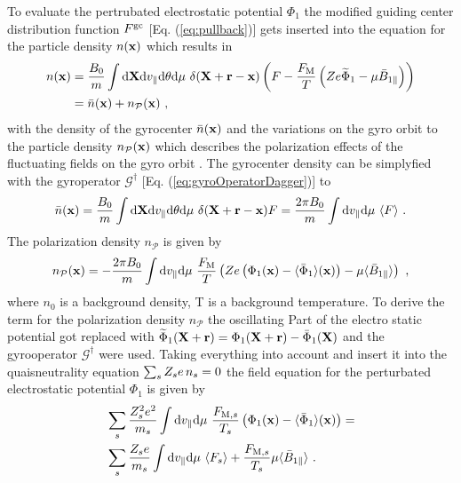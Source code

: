 To evaluate the pertrubated electrostatic potential $\Phi_1$ the modified guiding center distribution function $F^\mathrm{gc}$ [Eq. (\ref{eq:pullback})] gets inserted into the equation for the particle density $n(\boldsymbol{\mathbf{x}})$ which results in
\begin{gather}
	\begin{aligned}
		n(\boldsymbol{\mathbf{x}}) &= \frac{B_0}{m} \int \mathrm{d}\boldsymbol{\mathbf{X}}\mathrm{d}v_\parallel\mathrm{d}\theta\mathrm{d}\mu ~ \delta(\boldsymbol{\mathbf{X}} + \boldsymbol{\mathbf{r}} - \boldsymbol{\mathbf{x}}) \left(F - \frac{F_\mathrm{M}}{T}\left(Ze \widetilde{\Phi}_1 - \mu \bar{B}_{1\parallel}\right) \right)\\
		     &= \bar{n}(\boldsymbol{\mathbf{x}}) + n_\mathcal{P}(\boldsymbol{\mathbf{x}})~,
	\end{aligned}
	\label{densityPullback}
\end{gather}
with the density of the gyrocenter $\bar{n}(\boldsymbol{\mathbf{x}})$ and the variations on the gyro orbit to the particle density $n_\mathcal{P}(\boldsymbol{\mathbf{x}})$ which describes the polarization effects of the fluctuating fields on the gyro orbit \cite{Brizard2007}. The gyrocenter density can be simplyfied with the gyroperator $\mathcal{G}^\dagger$ [Eq. (\ref{eq:gyroOperatorDagger})] to
\begin{gather}
		\bar{n}(\boldsymbol{\mathbf{x}}) = \frac{B_0}{m} \int \mathrm{d}\boldsymbol{\mathbf{X}}\mathrm{d}v_\parallel\mathrm{d}\theta\mathrm{d}\mu ~ \delta(\boldsymbol{\mathbf{X}} + \boldsymbol{\mathbf{r}} - \boldsymbol{\mathbf{x}}) F = \frac{2\pi B_0}{m} \int \mathrm{d}v_\parallel\mathrm{d}\mu ~ \langle F\rangle~.
	\label{eq:gyrocenterDensity}
\end{gather}
The polarization density $n_\mathcal{P}$ is given by
\begin{gather}
	n_\mathcal{P}(\boldsymbol{\mathbf{x}}) =  - \frac{2\pi B_0}{m} \int \mathrm{d}v_\parallel\mathrm{d}\mu ~ \frac{F_\mathrm{M}}{T} \left( Ze \left(\Phi_1(\boldsymbol{\mathbf{x}}) - \langle\bar{\Phi}_1\rangle(\boldsymbol{\mathbf{x}}) \right) -  \mu \langle\bar{B}_{1\parallel}\rangle \right) ~,
	\label{eq:polarizationDensity}
\end{gather}
where $n_0$ is a background density, T is a background temperature. To derive the term for the polarization density $n_\mathcal{P}$ the oscillating Part of the electro static potential got replaced with $\widetilde{\Phi}_1(\boldsymbol{\mathbf{X}}+ \boldsymbol{\mathbf{r}}) = \Phi_1(\boldsymbol{\mathbf{X}} + \boldsymbol{\mathbf{r}}) - \bar{\Phi}_1 (\boldsymbol{\mathbf{X}})$ and the gyrooperator $\mathcal{G}^\dagger$ were used. Taking everything into account and insert it into the quaisneutrality equation $\sum_s Z_s e \, n_s = 0$ the field equation for the perturbated electrostatic potential $\Phi_1$ is given by
\begin{gather}
	\begin{aligned}
		&\sum_s \frac{Z^2_s e^2}{m_s} \int \mathrm{d}v_\parallel\mathrm{d}\mu ~ \frac{F_{\mathrm{M},s}}{T_s} \left(\Phi_1(\boldsymbol{\mathbf{x}}) - \langle\bar{\Phi}_1\rangle(\boldsymbol{\mathbf{x}}) \right) =  \\
		&\sum_s \frac{Z_s e}{m_s} \int \mathrm{d}v_\parallel\mathrm{d}\mu ~ \langle F_s\rangle + \frac{F_{\mathrm{M},s}}{T_s} \mu \langle\bar{B}_{1\parallel}\rangle ~.
	\end{aligned}
	\label{eq:fieldPotential}
\end{gather}

